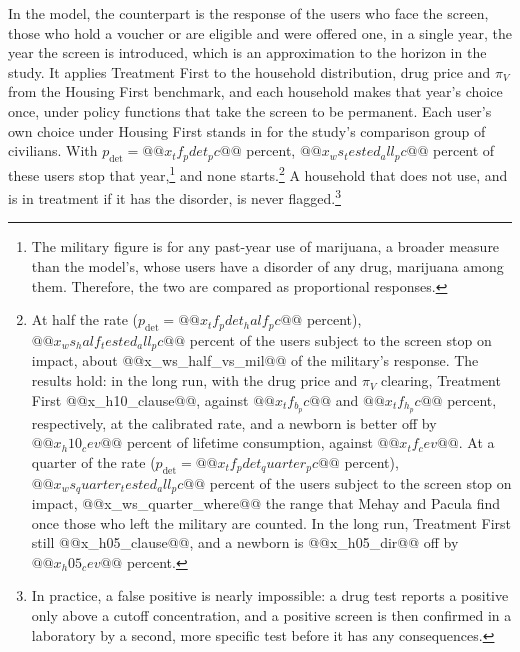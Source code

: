\documentclass[10pt]{article}
\begin{document}
  In the model, the counterpart  is the response of  the users who face the screen, those who hold a voucher or are eligible and were offered one, in a single year, the year the screen is introduced, which is an approximation to the horizon in the study. It applies Treatment First to the household distribution, drug price and $\pi_V$ from the Housing First benchmark, and each household makes that year's choice once, under policy functions that take the screen to be permanent.  Each user's own choice under Housing First stands in for the study's comparison group of civilians.  With $p_{\mathrm{det}}=@@x_tf_pdet_pc@@$ percent, $@@x_ws_tested_all_pc@@$ percent of  these users stop  that year,\footnote{The military figure is for any past-year use of marijuana, a broader measure than the model's, whose users have a disorder of any drug, marijuana among them. Therefore, the two are compared as proportional responses.} and none starts.\footnote{\label{fn:halfrate}At half the rate ($p_{\mathrm{det}}=@@x_tf_pdet_half_pc@@$ percent), $@@x_ws_half_tested_all_pc@@$ percent of the users subject to the screen stop on impact, about @@x_ws_half_vs_mil@@ of the military's response. The results hold: in the long run, with the drug price and $\pi_V$ clearing, Treatment First @@x_h10_clause@@, against $@@x_tf_b_pc@@$ and $@@x_tf_h_pc@@$ percent, respectively, at the calibrated rate, and a newborn is better off by $@@x_h10_cev@@$ percent of lifetime consumption, against $@@x_tf_cev@@$. At a quarter of the rate ($p_{\mathrm{det}}=@@x_tf_pdet_quarter_pc@@$ percent), $@@x_ws_quarter_tested_all_pc@@$ percent of
the users subject to the screen stop on impact, @@x_ws_quarter_where@@ the range that Mehay and Pacula find once those who
left the military are counted. In the long run, Treatment First still @@x_h05_clause@@, and a newborn is @@x_h05_dir@@ off
by $@@x_h05_cev@@$ percent.} A household that does not use, and is in treatment if it has the disorder, is never flagged.\footnote{In practice, a false positive is  nearly impossible: a drug test reports a positive only above a cutoff concentration, and a positive screen is then confirmed in a laboratory by a second, more specific test before it has any consequences.}
\end{document}
